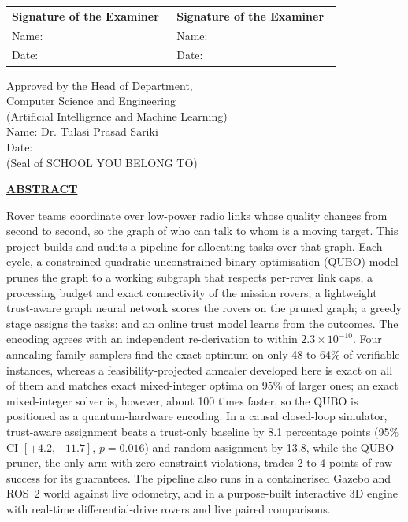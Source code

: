 \documentclass[12pt,a4paper,oneside]{report}
\theoremstyle{definition}
\theoremstyle{plain}
\theoremstyle{remark}
\providecommand{\programme}{Artificial Intelligence and Machine Learning}
\providecommand{\hodname}{Dr. Tulasi Prasad Sariki}
\newcommand{\frontheading}[1]{%
  \begin{center}{\fontsize{14}{17}\selectfont\bfseries\underline{#1}}\end{center}\vspace{10pt}}
\begin{document}
\vspace{0.8cm}
\noindent\begin{tabular}{@{}p{0.48\linewidth}p{0.48\linewidth}@{}}
\textbf{Signature of the Examiner} & \textbf{Signature of the Examiner}\\[6pt]
Name: & Name:\\[6pt]
Date: & Date:\\
\end{tabular}

\vspace{0.8cm}
\begin{center}
Approved by the Head of Department,\\
Computer Science and Engineering\\
(\programme)\\[6pt]
Name: \hodname\\
Date:\\[0.6cm]
(Seal of SCHOOL YOU BELONG TO)
\end{center}
\clearpage

\setcounter{page}{1}
{}
\frontheading{ABSTRACT}

Rover teams coordinate over low-power radio links whose quality changes from
second to second, so the graph of who can talk to whom is a moving target. This
project builds and audits a pipeline for allocating tasks over that graph. Each
cycle, a constrained quadratic unconstrained binary optimisation (QUBO) model
prunes the graph to a working subgraph that respects per-rover link caps, a
processing budget and exact connectivity of the mission rovers; a lightweight
trust-aware graph neural network scores the rovers on the pruned graph; a
greedy stage assigns the tasks; and an online trust model learns from the
outcomes. The encoding agrees with an independent re-derivation to within
$2.3\times10^{-10}$. Four annealing-family samplers find the exact optimum on
only 48 to 64\% of verifiable instances, whereas a feasibility-projected
annealer developed here is exact on all of them and matches exact
mixed-integer optima on 95\% of larger ones; an exact mixed-integer solver is,
however, about 100 times faster, so the QUBO is positioned as a
quantum-hardware encoding. In a causal closed-loop simulator, trust-aware
assignment beats a trust-only baseline by 8.1 percentage points (95\% CI
$[+4.2,+11.7]$, $p=0.016$) and random assignment by 13.8, while the QUBO
pruner, the only arm with zero constraint violations, trades 2 to 4 points of
raw success for its guarantees. The pipeline also runs in a containerised
Gazebo and ROS~2 world against live odometry, and in a purpose-built
interactive 3D engine with real-time differential-drive rovers and live paired
comparisons.
\end{document}
